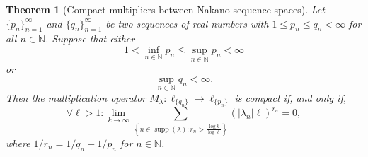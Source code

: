 \documentclass[11pt]{amsart}
\theoremstyle{definition}
\newtheorem{theorem}{Theorem}[section]
\theoremstyle{definition}
\theoremstyle{definition}
\theoremstyle{definition}
\theoremstyle{definition}
\theoremstyle{definition}
\theoremstyle{definition}
\theoremstyle{definition}
\numberwithin{equation}{section}
\numberwithin{equation}{section}
\numberwithin{equation}{section}
\theoremstyle{definition}
\theoremstyle{definition}
\theoremstyle{definition}
\theoremstyle{definition}
\theoremstyle{definition}
\theoremstyle{definition}
\DeclareMathOperator{\supp}{supp}
\newcommand{\abs}[1]{\left\lvert#1\right\rvert}
\begin{document}
	\begin{theorem}[Compact multipliers between Nakano sequence spaces] \label{PROPOSITION: Compact multipliers between Nakano}
		{\it Let $\{p_n\}_{n=1}^{\infty}$ and $\{q_n\}_{n=1}^{\infty}$ be two sequences of real numbers with $1 \leqslant p_n \leqslant q_n < \infty$
			for all $n \in \mathbb{N}$. Suppose that either
			\begin{equation*}
				1 < \inf\limits_{n \in \mathbb{N}} p_n \leqslant \sup\limits_{n \in \mathbb{N}} p_n < \infty
			\end{equation*}
			or
			\begin{equation*}
				\sup\limits_{n \in \mathbb{N}} q_n < \infty.
			\end{equation*}
			Then the multiplication operator $M_{\lambda} \colon \ell_{\{q_n\}} \rightarrow \ell_{\{p_n\}}$ is compact if, and only if,}
		\begin{equation*}
			\forall \ell > 1 \colon \lim\limits_{k \rightarrow \infty} \sum_{\left\{ n \in \supp(\lambda) \colon r_n > \frac{\log k}{\log \ell} \right\}}
				\left( \abs{\lambda_n} \ell \right)^{r_n} = 0,
		\end{equation*}
		{\it where $1/r_n = 1/q_n - 1/p_n$ for $n \in \mathbb{N}$.}
	\end{theorem}
\end{document}
